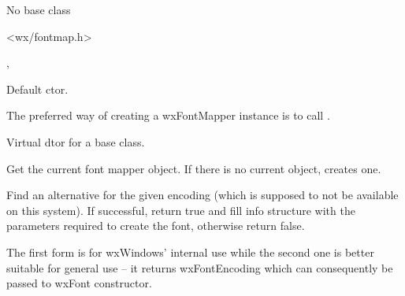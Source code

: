 
No base class


<wx/fontmap.h>


, 


\label{wxfontmapperwxfontmapper}


Default ctor.


The preferred way of creating a wxFontMapper instance is to call 
.

\label{wxfontmapperdtor}


Virtual dtor for a base class.

\label{wxfontmapperget}


Get the current font mapper object. If there is no current object, creates
one.



\label{wxfontmappergetaltforencoding}



Find an alternative for the given encoding (which is supposed to not be
available on this system). If successful, return true and fill info
structure with the parameters required to create the font, otherwise
return false.

The first form is for wxWindows' internal use while the second one
is better suitable for general use -- it returns wxFontEncoding which
can consequently be passed to wxFont constructor.


